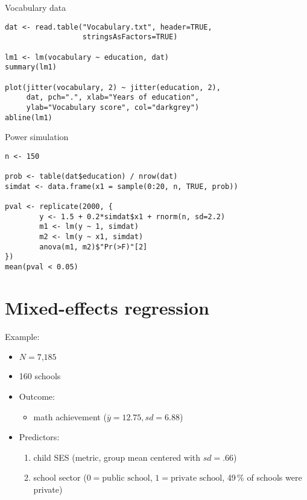 \documentclass{beamer}
\begin{document}
{

\begin{frame}[fragile]{Vocabulary data}
  \begin{lstlisting}
dat <- read.table("Vocabulary.txt", header=TRUE, 
                  stringsAsFactors=TRUE)

lm1 <- lm(vocabulary ~ education, dat)
summary(lm1)

plot(jitter(vocabulary, 2) ~ jitter(education, 2),
     dat, pch=".", xlab="Years of education",
     ylab="Vocabulary score", col="darkgrey")
abline(lm1)
  \end{lstlisting}
\end{frame}

\begin{frame}[fragile]{Power simulation}
  \begin{lstlisting}
n <- 150

prob <- table(dat$education) / nrow(dat)
simdat <- data.frame(x1 = sample(0:20, n, TRUE, prob))

pval <- replicate(2000, {
        y <- 1.5 + 0.2*simdat$x1 + rnorm(n, sd=2.2)
        m1 <- lm(y ~ 1, simdat)
        m2 <- lm(y ~ x1, simdat)
        anova(m1, m2)$"Pr(>F)"[2]
})
mean(pval < 0.05)
  \end{lstlisting}
\end{frame}

}

\section{Mixed-effects regression}

\begin{frame}{Example: \citet{Bauer2005}}
  \begin{itemize}
    \item $N = \text{7,185}$
    \item 160 schools
    \item Outcome:
      \begin{itemize}
        \item math achievement ($\bar y = 12.75, sd = 6.88$)
      \end{itemize}
    \item Predictors:
      \begin{enumerate}
        \item child SES (metric, group mean centered with $sd = .66$)
        \item school sector ($0 = \text{public school}$, $1 = \text{private
          school}$, 49\,\% of schools were private)
      \end{enumerate}
  \end{itemize}
\end{frame}
\end{document}
